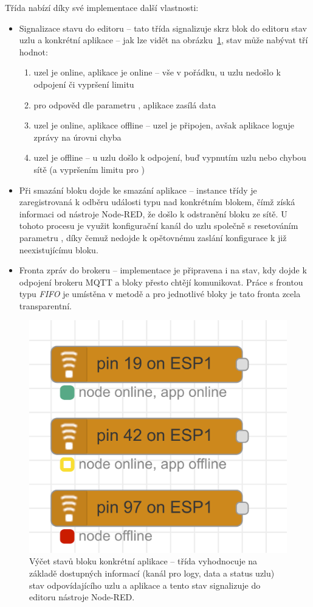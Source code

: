 Třída  nabízí díky své implementace další vlastnosti:
\begin{itemize}
    \item Signalizace stavu do editoru -- tato třída signalizuje skrz blok do editoru stav uzlu a konkrétní
    aplikace -- jak lze vidět na obrázku~\ref{fig:fis-node-status}, stav může nabývat tří hodnot:
    \begin{enumerate}
        \item uzel je online, aplikace je online -- vše v pořádku, u uzlu nedošlo k odpojení či vypršení limitu
        \item pro odpověd dle parametru , aplikace zasílá data
        \item uzel je online, aplikace offline -- uzel je připojen, avšak aplikace loguje zprávy na úrovni chyba
        \item uzel je offline -- u uzlu došlo k odpojení, buď vypnutím uzlu nebo chybou sítě (a vypršením limitu pro
        )
    \end{enumerate}
    \item Při smazání bloku dojde ke smazání aplikace -- instance třídy  je zaregistrovaná k odběru
    události typu  nad konkrétním blokem, čímž získá informaci od nástroje Node-RED, že došlo k
    odstranění bloku ze sítě.
    U tohoto procesu je využit konfigurační kanál do uzlu společně s resetováním parametru , díky čemuž
    nedojde k opětovnému zaslání konfigurace k již neexistujícímu bloku.
    \item Fronta zpráv do brokeru -- implementace je připravena i na stav, kdy dojde k odpojení brokeru MQTT a bloky
    přesto chtějí komunikovat.
    Práce s frontou typu \textit{FIFO} je umístěna v metodě  a pro jednotlivé bloky je tato fronta zcela
    transparentní.
\end{itemize}

\begin{figure}
    \centering
    \includegraphics[width=.5\textwidth]{figures/fis-node-status.png}
    \caption{Výčet stavů bloku konkrétní aplikace -- třída  vyhodnocuje na základě dostupných informací
    (kanál pro logy, data a status uzlu) stav odpovídajícího uzlu a aplikace a tento stav signalizuje do editoru
    nástroje Node-RED.}
    \label{fig:fis-node-status}
\end{figure}

